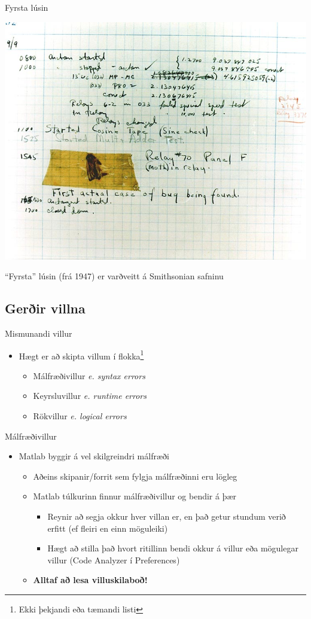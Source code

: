 \documentclass{beamer}
\begin{document}
\begin{frame}{Fyrsta lúsin}
\begin{center}
\includegraphics[width=0.7\linewidth]{Pics/first-bug}

``Fyrsta'' lúsin (frá 1947) er varðveitt á Smithsonian safninu
\end{center}
\end{frame}

\subsection{Gerðir villna}

\begin{frame}{Mismunandi villur}
\begin{itemize}
 \item Hægt er að skipta villum í flokka\footnote{Ekki þekjandi eða tæmandi listi}
 \begin{itemize}
  \item Málfræðivillur \emph{e. syntax errors}
  \item Keyrsluvillur \emph{e. runtime errors}
  \item Rökvillur \emph{e. logical errors}
 \end{itemize}
\end{itemize}

\end{frame}

\begin{frame}{Málfræðivillur}
\begin{itemize}
 \item Matlab byggir á vel skilgreindri málfræði
 \begin{itemize}
  \item Aðeins skipanir/forrit sem fylgja málfræðinni eru lögleg
  \item Matlab túlkurinn finnur málfræðivillur og bendir á þær
  \begin{itemize}
   \item Reynir að segja okkur hver villan er, en það getur stundum verið erfitt (ef fleiri en einn möguleiki)
   \item Hægt að stilla það hvort ritillinn bendi okkur á villur eða mögulegar villur (Code Analyzer í Preferences)
  \end{itemize}
  \item \textbf{Alltaf að lesa villuskilaboð!}
 \end{itemize}
\end{itemize}
\end{frame}
\end{document}
